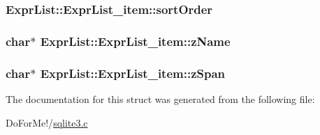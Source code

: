 \hypertarget{struct_expr_list_1_1_expr_list__item_af9084dc073f96792c0c7a8a894778881}{
\subsubsection[{sort\-Order}]{ Expr\-List\-::\-Expr\-List\-\_\-item\-::sort\-Order}}\label{struct_expr_list_1_1_expr_list__item_af9084dc073f96792c0c7a8a894778881}
\hypertarget{struct_expr_list_1_1_expr_list__item_af278eb03a1169c73d144547adaf9b04f}{
\subsubsection[{z\-Name}]{\setlength{\rightskip}{0pt plus 5cm}char$\ast$ Expr\-List\-::\-Expr\-List\-\_\-item\-::z\-Name}}\label{struct_expr_list_1_1_expr_list__item_af278eb03a1169c73d144547adaf9b04f}
\hypertarget{struct_expr_list_1_1_expr_list__item_ade485bb6fafb44ec2aba59d05b8d117b}{
\subsubsection[{z\-Span}]{\setlength{\rightskip}{0pt plus 5cm}char$\ast$ Expr\-List\-::\-Expr\-List\-\_\-item\-::z\-Span}}\label{struct_expr_list_1_1_expr_list__item_ade485bb6fafb44ec2aba59d05b8d117b}


The documentation for this struct was generated from the following file\-:\begin{DoxyCompactItemize}
\item 
Do\-For\-Me!/\hyperlink{sqlite3_8c}{sqlite3.\-c}\end{DoxyCompactItemize}

